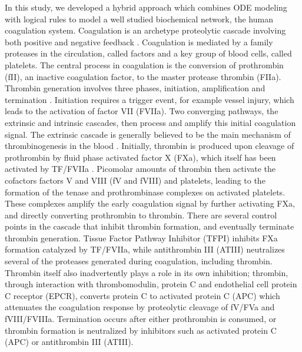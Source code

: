 \documentclass[12pt]{article}
\begin{document}
In this study, we developed a hybrid approach which combines ODE modeling with logical rules to model a well studied biochemical network, 
the human coagulation system. Coagulation is an archetype proteolytic cascade involving both positive 
and negative feedback \cite{Butenas:2002aa,Schenone:2004aa,Adams:2009aa}. 
Coagulation is mediated by a family proteases in the circulation, called factors and a key group of blood cells, called platelets. 
The central process in coagulation is the conversion of prothrombin (fII), an inactive coagulation factor, to the master protease thrombin (FIIa).
Thrombin generation involves three phases, initiation, amplification and termination \cite{GOLDHABER2006, Brummel:2002aa}.
Initiation requires a trigger event, for example vessel injury, which leads to the activation of factor VII (FVIIa).
Two converging pathways, the extrinsic and intrinsic cascades, then process and amplify this initial coagulation signal. 
The extrinsic cascade is generally believed to be the main mechanism of thrombinogenesis in the blood \cite{MANN1990,ROBERTS1998,MANN1999}.
Initially, thrombin is produced upon cleavage of prothrombin by fluid phase activated factor X (FXa), which itself has been activated by TF/FVIIa \cite{Butenas:2002aa}. 
Picomolar amounts of thrombin then activate the cofactors factors V and VIII (fV and fVIII) and platelets, 
leading to the formation of the tenase and prothrombinase complexes on activated platelets.
These complexes amplify the early coagulation signal by further activating FXa, and directly converting prothrombin to thrombin. 
There are several control points in the cascade that inhibit thrombin formation, and eventually terminate thrombin generation. 
Tissue Factor Pathway Inhibitor (TFPI) inhibits FXa formation catalyzed by TF/FVIIa, while antithrombin III (ATIII)
neutralizes several of the proteases generated during coagulation, including thrombin.  
Thrombin itself also inadvertently plays a role in its own inhibition; thrombin, through interaction with thrombomodulin, protein C and endothelial cell protein C receptor (EPCR),
converts protein C to activated protein C (APC) which attenuates the coagulation response by proteolytic cleavage of fV/FVa and fVIII/FVIIIa. 
Termination occurs after either prothrombin is consumed, or thrombin formation is neutralized by inhibitors such as activated protein C (APC) or antithrombin III (ATIII).   
\end{document}
